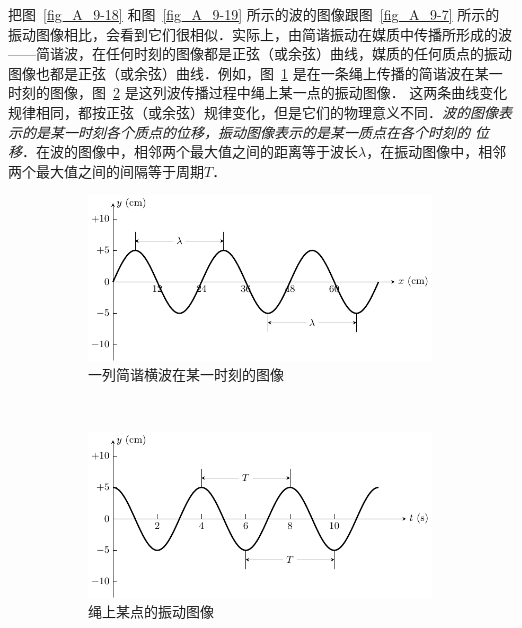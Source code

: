 把图~\ref{fig_A_9-18} 和图~\ref{fig_A_9-19} 所示的波的图像跟图~\ref{fig_A_9-7} 所示的振动图像相比，会看到它们很相似．实际上，由简谐振动在媒质中传播所形成的波——简谐波，在任何时刻的图像都是正弦（或余弦）曲线，媒质的任何质点的振动图像也都是正弦（或余弦）曲线．例如，图~\ref{fig_A_9-20a} 是在一条绳上传播的简谐波在某一时刻的图像，图~\ref{fig_A_9-20b} 是这列波传播过程中绳上某一点的振动图像．
这两条曲线变化规律相同，都按正弦（或余弦）规律变化，但是它们的物理意义不同．\textit{波的图像表示的是某一时刻各个质点的位移，振动图像表示的是某一质点在各个时刻的
位移}．在波的图像中，相邻两个最大值之间的距离等于波长$\lambda$，在振动图像中，相邻两个最大值之间的间隔等于周期$T$．
\begin{figure}[htbp]
    \centering
    \begin{subfigure}{0.8\linewidth}
        \centering
        \includegraphics{fig/A/9-20a.pdf}
        \caption{一列简谐横波在某一时刻的图像}\label{fig_A_9-20a}
    \end{subfigure}
    \\
    \begin{subfigure}{0.8\linewidth}
        \centering
        \includegraphics{fig/A/9-20b.pdf}
        \caption{绳上某点的振动图像}\label{fig_A_9-20b}
    \end{subfigure}
    \caption{}\label{fig_A_9-20}
\end{figure}

